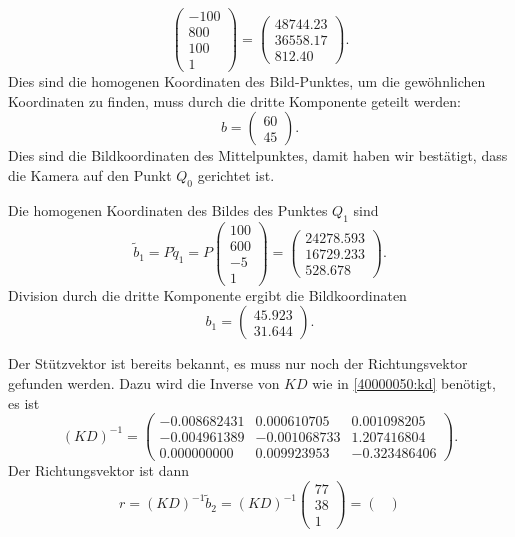 \begin{loesung}
\begin{teilaufgaben}
\[\begin{pmatrix}
-100\\800\\100\\1
\end{pmatrix}
=
\begin{pmatrix}
   48744.23\\
   36558.17\\
     812.40
\end{pmatrix}.
\]
Dies sind die homogenen Koordinaten des Bild-Punktes, um die gewöhnlichen
Koordinaten zu finden, muss durch die dritte Komponente geteilt werden:
\[
b
=
\begin{pmatrix}
60\\45
\end{pmatrix}.
\]
Dies sind die Bildkoordinaten des Mittelpunktes, damit haben
wir bestätigt, dass die Kamera auf den Punkt $Q_0$ gerichtet ist.
\item
Die homogenen Koordinaten des Bildes des Punktes $Q_1$ sind
\[
\tilde b_1
=
P\tilde q_1
=
P\begin{pmatrix}100\\600\\-5\\1\end{pmatrix}
=
\begin{pmatrix}
   24278.593\\
   16729.233\\
     528.678
\end{pmatrix}.
\]
Division durch die dritte Komponente ergibt die Bildkoordinaten
\[
b_1 = \begin{pmatrix}
   45.923\\
   31.644
\end{pmatrix}.
\]
\item
Der Stützvektor ist bereits bekannt, es muss nur noch der Richtungsvektor
gefunden werden.
Dazu wird die Inverse von $KD$ wie in \eqref{40000050:kd} benötigt,
es ist
\[
(KD)^{-1}
=
\begin{pmatrix}
  -0.008682431&  0.000610705&  0.001098205\\
  -0.004961389& -0.001068733&  1.207416804\\
   0.000000000&  0.009923953& -0.323486406
\end{pmatrix}.
\]
Der Richtungsvektor ist dann
\[
r = (KD)^{-1}\tilde b_2 = (KD)^{-1} \begin{pmatrix} 77\\ 38\\ 1\end{pmatrix}
=
\begin{pmatrix}

\end{pmatrix}\]
\end{teilaufgaben}
\end{loesung}

